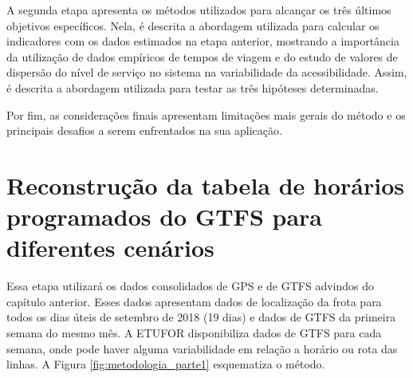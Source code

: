 \documentclass[        
    a4paper,          %
    12pt,             %
    chapter=TITLE,    %
    section=Title,    %
    subsection=Title, %
    oneside,          %
    english,          %
    spanish,          %
    brazil,           %
    fleqn             %
]{abntex2}
\begin{document}
  A segunda etapa apresenta os métodos utilizados para alcançar os três últimos objetivos específicos. Nela, é descrita a abordagem utilizada para calcular os indicadores com os dados estimados na etapa anterior, mostrando a importância da utilização de dados empíricos de tempos de viagem e do estudo de valores de dispersão do nível de serviço no sistema na variabilidade da acessibilidade. Assim, é descrita a abordagem utilizada para testar as três hipóteses determinadas.
  
  Por fim, as considerações finais apresentam limitações mais gerais do método e os principais desafios a serem enfrentados na sua aplicação.
  
  \hypertarget{reconstrucao-da-tabela-de-horarios-programados-do-gtfs-para-diferentes-cenarios}{%
  \section{Reconstrução da tabela de horários programados do GTFS para diferentes cenários}\label{reconstrucao-da-tabela-de-horarios-programados-do-gtfs-para-diferentes-cenarios}}
  
  Essa etapa utilizará os dados consolidados de GPS e de GTFS advindos do capítulo anterior. Esses dados apresentam dados de localização da frota para todos os dias úteis de setembro de 2018 (19 dias) e dados de GTFS da primeira semana do mesmo mês. A ETUFOR disponibiliza dados de GTFS para cada semana, onde pode haver alguma variabilidade em relação a horário ou rota das linhas. A Figura \ref{fig:metodologia_parte1} esquematiza o método.
  
  \begin{figure}[!h]
  \captionsetup{width=16cm}
  \centering
  \end{figure}
  
\end{document}
